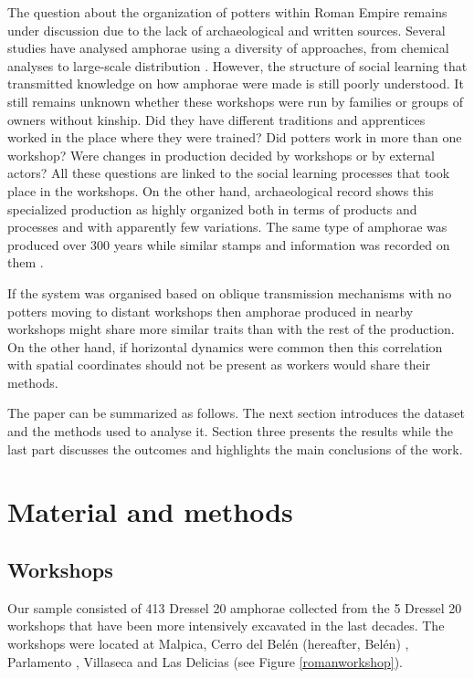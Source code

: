 \documentclass[review]{elsarticle}
\begin{document}
The question about the organization of potters within Roman Empire remains under discussion due to the lack of archaeological and written sources. Several studies have analysed amphorae using a diversity of approaches, from chemical analyses to large-scale distribution \citep{isaksen_network_2006,brughmans_roman_2016,coto-sarmiento_maria_bayesian_????}. However, the structure of social learning that transmitted knowledge on how amphorae were made is still poorly understood. It still remains unknown whether these workshops were run by families or groups of owners without kinship. Did they have different traditions and apprentices worked in the place where they were trained? Did potters work in more than one workshop? Were changes in production decided by workshops or by external actors? All these questions are linked to the social learning processes that took place in the workshops. On the other hand, archaeological record shows this specialized production as highly organized both in terms of products and processes and with apparently few variations. The same type of amphorae was produced over 300 years while similar stamps and information was recorded on them \citep{remesal_anforas_2004}.

If the system was organised based on oblique transmission mechanisms with no potters moving to distant workshops then amphorae produced in nearby workshops might share more similar traits than with the rest of the production. On the other hand, if horizontal dynamics were common then this correlation with spatial coordinates should not be present as workers would share their methods.

The paper can be summarized as follows. The next section introduces the dataset and the methods used to analyse it. Section three presents the results while the last part discusses the outcomes and highlights the main conclusions of the work. 

\section{Material and methods}

\subsection{Workshops}

Our sample consisted of 413 Dressel 20 amphorae collected from the 5 Dressel 20 workshops that have been more intensively excavated in the last decades. The workshops were located at Malpica, Cerro del Belén (hereafter, Belén) \citep{diaz_trujillo_excavacion_1992}, Parlamento \citep{garcia_vargas_anforas_2000}, Villaseca \citep{garcia_vargas_enrique_excavacion_????} and Las Delicias \citep{fernandez_excavacion_2001,_atelier_2014} (see Figure \ref{romanworkshop}).
\end{document}
